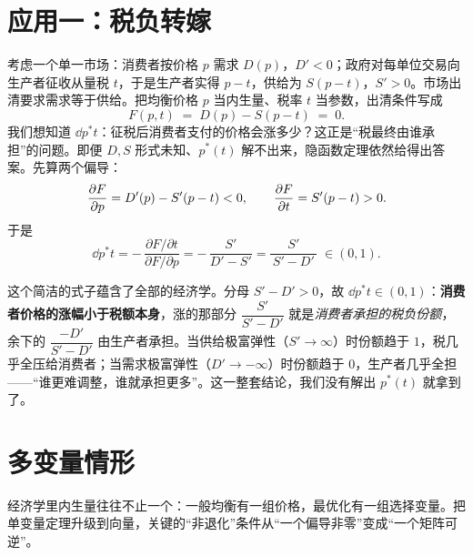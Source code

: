 
\section{应用一：税负转嫁}
\label{sec:ift-tax}

考虑一个单一市场：消费者按价格 $p$ 需求 $D(p)$，$D'<0$；政府对每单位交易向生产者征收从量税 $t$，于是生产者实得 $p-t$，供给为 $S(p-t)$，$S'>0$。市场出清要求需求等于供给。把均衡价格 $p$ 当内生量、税率 $t$ 当参数，出清条件写成
\[
    F(p,t)\;=\;D(p)-S(p-t)\;=\;0 .
\]
我们想知道 $\dd{p^*}{t}$：征税后消费者支付的价格会涨多少？这正是``税最终由谁承担''的问题。即便 $D,S$ 形式未知、$p^*(t)$ 解不出来，隐函数定理依然给得出答案。先算两个偏导：
\[
    \frac{\partial F}{\partial p}=D'(p)-S'(p-t)<0,
    \qquad
    \frac{\partial F}{\partial t}=S'(p-t)>0 .
\]
于是
\[
    \dd{p^*}{t}
    =-\,\frac{\partial F/\partial t}{\partial F/\partial p}
    =-\,\frac{S'}{D'-S'}
    =\frac{S'}{\,S'-D'\,}\;\in(0,1).
\]

这个简洁的式子蕴含了全部的经济学。分母 $S'-D'>0$，故 $\dd{p^*}{t}\in(0,1)$：\textbf{消费者价格的涨幅小于税额本身}，涨的那部分 $\dfrac{S'}{S'-D'}$ 就是\emph{消费者承担的税负份额}，余下的 $\dfrac{-D'}{S'-D'}$ 由生产者承担。当供给极富弹性（$S'\to\infty$）时份额趋于 $1$，税几乎全压给消费者；当需求极富弹性（$D'\to-\infty$）时份额趋于 $0$，生产者几乎全担——``谁更难调整，谁就承担更多''。这一整套结论，我们没有解出 $p^*(t)$ 就拿到了。

\section{多变量情形}
\label{sec:ift-multivariate}

经济学里内生量往往不止一个：一般均衡有一组价格，最优化有一组选择变量。把单变量定理升级到向量，关键的``非退化''条件从``一个偏导非零''变成``一个矩阵可逆''。


